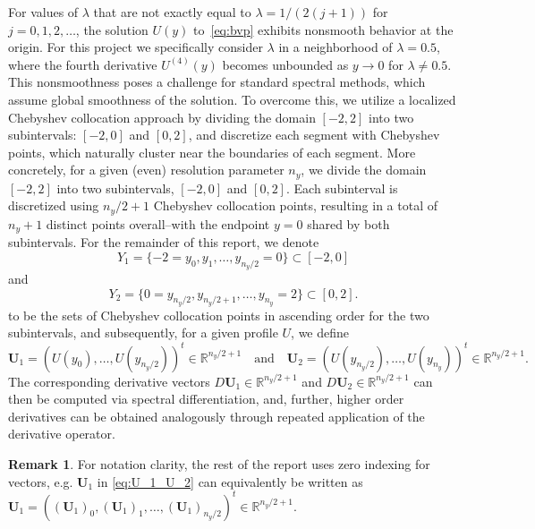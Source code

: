 \documentclass[12pt]{article}
\theoremstyle{definition}\newtheorem{lemma}{Lemma}
\newtheorem{remark}{Remark}
\begin{document}
For values of $\lambda$ that are not exactly equal to $\lambda = 1/(2(j+1))$ for $j = 0, 1, 2, \ldots$, the solution $U(y)$ to~\eqref{eq:bvp} exhibits nonsmooth behavior at the origin. For this project we specifically consider $\lambda$ in a neighborhood of $\lambda=0.5$, where the fourth derivative $U^{(4)}(y)$ becomes unbounded as $y \to 0$ for $\lambda \neq 0.5$. This nonsmoothness poses a challenge for standard spectral methods, which assume global smoothness of the solution. 
To overcome this, we utilize a localized Chebyshev collocation approach by dividing the domain $[-2, 2]$ into two subintervals: $[-2, 0]$ and $[0, 2]$, and discretize each segment with Chebyshev points, which naturally cluster near the boundaries of each segment. More concretely, for a given (even) resolution parameter $n_y$, we divide the domain $[-2, 2]$ into two subintervals, $[-2, 0]$ and $[0, 2]$. Each subinterval is discretized using $n_y/2 + 1$ Chebyshev collocation points, resulting in a total of $n_y + 1$ distinct points overall--with the endpoint $y = 0$ shared by both subintervals. For the remainder of this report, we denote
\begin{equation}
    Y_1 = \{-2=y_0, y_1, \ldots, y_{n_y/2}=0\}\subset [-2, 0]
\end{equation}
and
\begin{equation}
    Y_2 = \{0=y_{n_y/2}, y_{n_y/2+1}, \ldots, y_{n_y}=2\} \subset [0, 2].
\end{equation}
to be the sets of Chebyshev collocation points in ascending order for the two subintervals, and subsequently, for a given profile $U$, we define
\begin{equation}\label{eq:U_1_U_2}
    \mathbf{U}_1 = (U(y_0), \ldots, U(y_{n_y/2}))^t \in \mathbb{R}^{n_y/2+1} \quad \text{and} \quad \mathbf{U}_2 = (U(y_{n_y/2}), \ldots, U(y_{n_y}))^t \in \mathbb{R}^{n_y/2+1}.
\end{equation}
The corresponding derivative vectors $D\mathbf{U}_1 \in \mathbb{R}^{n_y/2+1}$ and $D \mathbf{U}_2 \in \mathbb{R}^{n_y/2+1}$ can then be computed via spectral differentiation, and, further, higher order derivatives can be obtained analogously through repeated application of the derivative operator.
\begin{remark}
    For notation clarity, the rest of the report uses zero indexing for vectors, e.g. $\mathbf{U}_1 $ in \eqref{eq:U_1_U_2} can equivalently be written as $\mathbf{U}_1 = ((\mathbf{U}_1)_0, (\mathbf{U}_1)_1, \ldots, (\mathbf{U}_1)_{n_y/2})^t \in \mathbb{R}^{n_y/2+1}$.
\end{remark}
\end{document}
